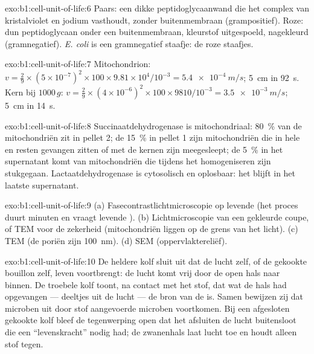 \begin{solution}{exo:b1:cell-unit-of-life:6}
Paars: een dikke peptidoglycaanwand die het complex van kristalviolet en jodium
vasthoudt, zonder buitenmembraan (grampositief). Roze: dun peptidoglycaan onder
een buitenmembraan, kleurstof uitgespoeld, nagekleurd (gramnegatief).
\emph{E. coli} is een gramnegatief staafje: de roze staafjes.
\end{solution}

\begin{solution}{exo:b1:cell-unit-of-life:7}
Mitochondrion: $v = \frac{2}{9}\times(5\times 10^{-7})^2\times 100\times
9.81\times 10^4/10^{-3} = \qty{5.4e-4}{m/s}$; \qty{5}{cm} in
\qty{92}{s}. Kern bij $1000\,g$: $v = \frac{2}{9}\times(4\times
10^{-6})^2\times 100\times 9810/10^{-3} = \qty{3.5e-3}{m/s}$; \qty{5}{cm}
in \qty{14}{s}.
\end{solution}

\begin{solution}{exo:b1:cell-unit-of-life:8}
Succinaatdehydrogenase is mitochondriaal: \qty{80}{\%} van de mitochondriën zit
in pellet 2; de \qty{15}{\%} in pellet 1 zijn mitochondriën die in hele  en
resten gevangen zitten of met de kernen zijn meegesleept; de \qty{5}{\%} in het
supernatant komt van mitochondriën die tijdens het homogeniseren zijn
stukgegaan. Lactaatdehydrogenase is cytosolisch en oplosbaar: het blijft in het
laatste supernatant.
\end{solution}

\begin{solution}{exo:b1:cell-unit-of-life:9}
(a) Fasecontrastlichtmicroscopie op levende  (het proces duurt minuten en
vraagt levende ). (b) Lichtmicroscopie van een gekleurde coupe, of TEM voor
de zekerheid (mitochondriën liggen op de grens van het licht). (c) TEM (de poriën
zijn \qty{100}{nm}). (d) SEM (oppervlaktereliëf).
\end{solution}

\begin{solution}{exo:b1:cell-unit-of-life:10}
De heldere kolf sluit uit dat de lucht zelf, of de gekookte bouillon zelf, leven
voortbrengt: de lucht komt vrij door de open hals naar binnen. De troebele kolf
toont, na contact met het stof, dat wat de hals had opgevangen --- deeltjes uit
de lucht --- de bron van de  is. Samen bewijzen zij dat microben uit
door stof aangevoerde microben voortkomen. Bij een afgesloten gekookte kolf bleef
de tegenwerping open dat het afsluiten de lucht buitensloot die een ``levenskracht''
nodig had; de zwanenhals laat lucht toe en houdt alleen stof tegen.
\end{solution}

